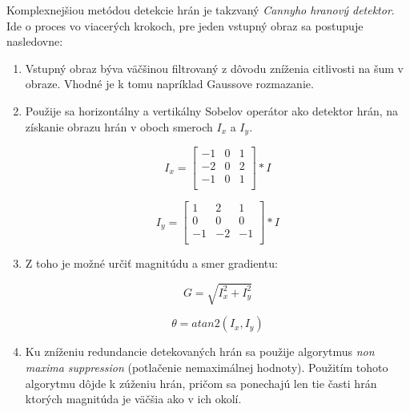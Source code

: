     Komplexnejšiou metódou detekcie hrán je takzvaný \emph{Cannyho hranový detektor}. Ide o proces vo viacerých krokoch, pre jeden vstupný obraz sa postupuje nasledovne:

    \begin{enumerate}
        \item Vstupný obraz býva väčšinou filtrovaný z dôvodu zníženia citlivosti na šum v obraze. Vhodné je k tomu napríklad Gaussove rozmazanie.
        
        \item Použije sa horizontálny a vertikálny Sobelov operátor ako detektor hrán, na získanie obrazu hrán v oboch smeroch \(I_{x}\) a \(I_{y}\).

        \begin{minipage}[b]{0.4\textwidth}
            \[I_{x} = 
            \begin{bmatrix}
                -1 & 0 & 1 \\
                -2 & 0 & 2 \\
                -1 & 0 & 1 \\
            \end{bmatrix}
            \ast I
            \]
        \end{minipage}
        \begin{minipage}[b]{0.4\textwidth}
            \[I_{y} = 
            \begin{bmatrix}
                 1 &  2 &  1 \\
                 0 &  0 &  0 \\
                -1 & -2 & -1 \\
            \end{bmatrix}
            \ast I
            \]
        \end{minipage}

        \item Z toho je možné určiť magnitúdu a smer gradientu:
        
        \begin{minipage}[b]{0.4\textwidth}
            \[G = \sqrt{I_x^2 + I_y^2}\]
        \end{minipage}
        \begin{minipage}[b]{0.4\textwidth}
            \[\theta = atan2(I_x, I_y)\]
        \end{minipage}
        
        \item Ku zníženiu redundancie detekovaných hrán sa použije algorytmus \emph{non maxima suppression} (potlačenie nemaximálnej hodnoty). Použitím tohoto algorytmu dôjde k zúženiu hrán, pričom sa ponechajú len tie časti hrán ktorých magnitúda je väčšia ako v ich okolí.
        

\end{enumerate}
